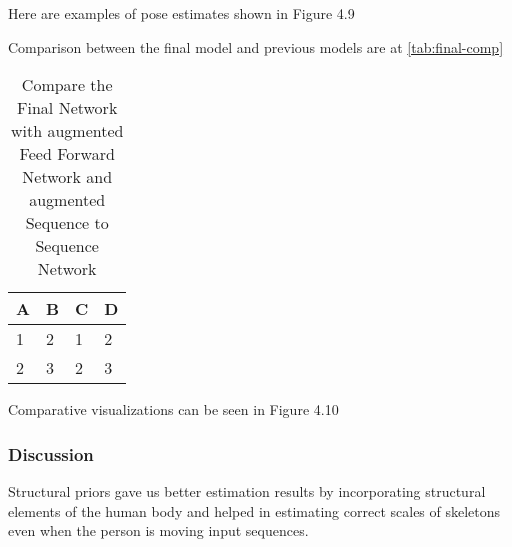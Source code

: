 Here are examples of pose estimates shown in Figure 4.9

Comparison between the final model and previous models are at \autoref{tab:final-comp}

\begin{table}[htpb]
    \centering
    \begin{tabular}{l l l l}
        \toprule
            A & B & C & D \\
        \midrule
            1 & 2 & 1 & 2 \\
            2 & 3 & 2 & 3 \\
        \bottomrule
    \end{tabular}
    \caption[Comparison Final]{Compare the Final Network with augmented Feed Forward Network and augmented Sequence to Sequence Network}\label{tab:final-comp}
\end{table}


Comparative visualizations can be seen in Figure 4.10

\subsubsection{Discussion}

Structural priors gave us better estimation results by incorporating structural elements of the human body and helped in estimating correct scales of skeletons even when the person is moving input sequences.

